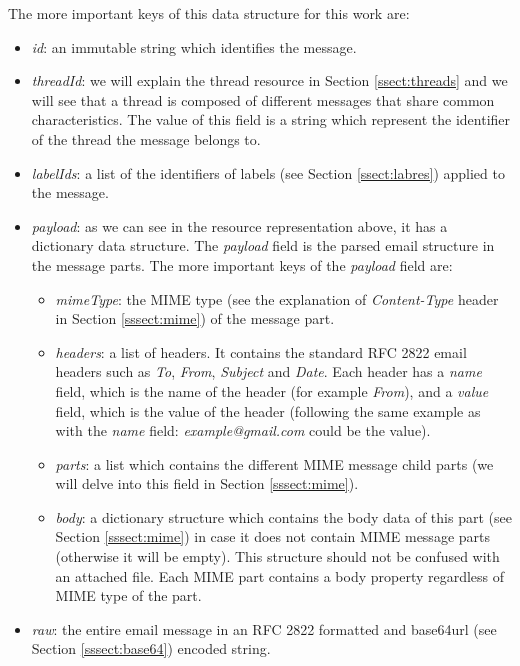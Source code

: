 The more important keys of this data structure for this work are:
\begin{itemize}
	\item\textit{id}: an immutable string which identifies the message.
	\item\textit{threadId}: we will explain the thread resource in Section \ref{ssect:threads} and we will see that a thread is composed of different messages that share common characteristics. The value of this field is a string which represent the identifier of the thread the message belongs to.
	\item\textit{labelIds}: a list of the identifiers of labels (see Section \ref{ssect:labres}) applied to the message.
	\item\textit{payload}: as we can see in the resource representation above, it has a dictionary data structure. The \textit{payload} field is the parsed email structure in the message parts. The more important keys of the \textit{payload} field are:
	\begin{itemize}
		\item\textit{mimeType}: the MIME type (see the explanation of \textit{Content-Type} header in Section \ref{sssect:mime}) of the message part.
		\item\textit{headers}: a list of headers. It contains the standard RFC 2822 \citep{rfc2822} email headers such as \textit{To}, \textit{From}, \textit{Subject} and \textit{Date}. Each header has a \textit{name} field, which is the name of the header (for example \textit{From}), and a \textit{value} field, which is the value of the header (following the same example as with the \textit{name} field: \textit{example@gmail.com} could be the value).
		\item\textit{parts}: a list which contains the different MIME message child parts (we will delve into this field in Section \ref{sssect:mime}).
		\item\textit{body}: a dictionary structure which contains the body data of this part (see Section \ref{sssect:mime}) in case it does not contain MIME message parts (otherwise it will be empty). This structure should not be confused with an attached file. Each MIME part contains a body property regardless of MIME type of the part.
	\end{itemize}
	\item\textit{raw}: the entire email message in an RFC 2822 \citep{rfc2822} formatted and base64url (see Section \ref{sssect:base64}) encoded string.
\end{itemize}

